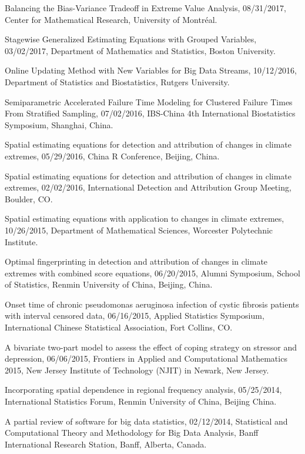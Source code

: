 \documentclass[Statistics]{vita}
\begin{document}
\begin{vita}
\begin{InvitedTalks}
  \item Balancing the Bias-Variance Tradeoff in Extreme Value Analysis, 08/31/2017, Center for Mathematical Research, University of Montr\'eal.
  \item Stagewise Generalized Estimating Equations with Grouped Variables, 03/02/2017, Department of Mathematics and Statistics, Boston University.
  \item Online Updating Method with New Variables for Big Data Streams, 10/12/2016, Department of Statistics and Biostatistics, Rutgers University.
  \item Semiparametric Accelerated Failure Time Modeling for Clustered Failure Times From Stratified Sampling, 07/02/2016, IBS-China 4th International Biostatistics Symposium, Shanghai, China.
  \item Spatial estimating equations for detection and attribution of changes in climate extremes, 05/29/2016, China R Conference, Beijing, China.
  \item Spatial estimating equations for detection and attribution of changes in climate extremes, 02/02/2016, International Detection and Attribution Group Meeting, Boulder, CO\@.
  \item Spatial estimating equations with application to changes in climate extremes, 10/26/2015, Department of Mathematical Sciences, Worcester Polytechnic Institute.
  \item Optimal fingerprinting in detection and attribution of changes in climate extremes with combined score equations, 06/20/2015, Alumni Symposium, School of Statistics, Renmin University of China, Beijing, China.
  \item Onset time of chronic pseudomonas aeruginosa infection of cystic fibrosis patients with interval censored data, 06/16/2015, Applied Statistics Symposium, International Chinese Statistical Association, Fort Collins, CO\@.
  \item A bivariate two-part model to assess the effect of coping strategy on stressor and depression, 06/06/2015, Frontiers in Applied and Computational Mathematics 2015, New Jersey Institute of Technology (NJIT) in Newark, New Jersey.
  \item Incorporating spatial dependence in regional frequency analysis, 05/25/2014, International Statistics Forum, Renmin University of China, Beijing China.
  \item A partial review of software for big data statistics, 02/12/2014, Statistical and Computational Theory and Methodology for Big Data Analysis, Banff International Research Station, Banff, Alberta, Canada.

\end{InvitedTalks}
\end{vita}
\end{document}
